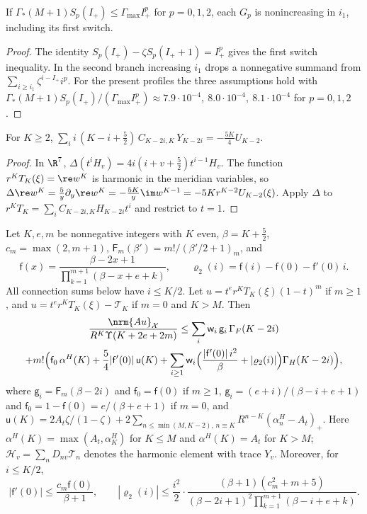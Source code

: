 \begin{lemma}\label{r7:lem-switch}
If $\Gamma_*(M+1)S_p(I_+)\leq\Gamma_{\max}I_+^p$ for $p=0,1,2$, each $G_p$ is nonincreasing in $i_1$, including its first switch.
\end{lemma}
\begin{proof}
The identity $S_p(I_+)-\zeta S_p(I_++1)=I_+^p$ gives the first switch inequality. In the second branch increasing $i_1$ drops a nonnegative summand from $\sum_{i\geq i_1}\zeta^{i-I_+}i^p$. For the present profiles the three assumptions hold with $\Gamma_*(M+1)S_p(I_+)/(\Gamma_{\max}I_+^p)\approx7.9\cdot10^{-4},\ 8.0\cdot10^{-4},\ 8.1\cdot10^{-4}$ for $p=0,1,2$.
\end{proof}
\begin{lemma}\label{r7:lem-lap}
For $K\geq2$, $\sum_ii\,(K-i+\frac52)\,C_{K-2i,K}\,Y_{K-2i}=-\frac{5K}4U_{K-2}$.
\end{lemma}

\begin{proof}
In $\R^7$, $\Delta(t^iH_v)=4i(i+v+\frac52)t^{i-1}H_v$. The function $r^KT_K(\xi)=\re w^K$ is harmonic in the meridian variables, so $\Delta\re w^K=\frac5y\partial_y\re w^K=-\frac{5K}y\im w^{K-1}=-5Kr^{K-2}U_{K-2}(\xi)$. Apply $\Delta$ to $r^KT_K=\sum_iC_{K-2i,K}H_{K-2i}t^i$ and restrict to $t=1$.
\end{proof}

\begin{lemma}\label{r7:lem-raw}
Let $K,e,m$ be nonnegative integers with $K$ even, $\beta=K+\frac52$, $c_m=\max(2,m+1)$, $\mathsf F_m(\beta')=m!/(\beta'/2+1)_m$, and
\[
\mathsf f(x)=\frac{\beta-2x+1}{\prod_{k=1}^{m+1}(\beta-x+e+k)},\qquad\varrho_2(i)=\mathsf f(i)-\mathsf f(0)-\mathsf f'(0)\,i .
\]
All connection sums below have $i\leq K/2$. Let $u=t^er^KT_K(\xi)(1-t)^m$ if $m\geq1$, and $u=t^er^KT_K(\xi)-\mathcal T_K$ if $m=0$ and $K>M$. Then
\begin{multline*}
\frac{\nrm{Au}_{\mathcal X}}{R^K\Upsilon(K+2e+2m)}\leq\sum_i\mathsf w_i\,\mathsf g_i\,\Gamma_F(K-2i)\\
+m!\Big(\mathsf f_0\,\alpha^H(K)+\frac54|\mathsf f'(0)|\,\mathsf u(K)+\sum_{i\geq1}\mathsf w_i\Big(\frac{|\mathsf f'(0)|\,i^2}\beta+|\varrho_2(i)|\Big)\Gamma_H(K-2i)\Big),
\end{multline*}
where $\mathsf g_i=\mathsf F_m(\beta-2i)$ and $\mathsf f_0=\mathsf f(0)$ if $m\geq1$, $\mathsf g_i=(e+i)/(\beta-i+e+1)$ and $\mathsf f_0=1-\mathsf f(0)=e/(\beta+e+1)$ if $m=0$, and $\mathsf u(K)=2A_t\zeta/(1-\zeta)+2\sum_{n\leq\min(M,K-2),\,n\equiv K}R^{n-K}(\alpha^H_n-A_t)_+$. Here $\alpha^H(K)=\max(A_t,\alpha^H_K)$ for $K\leq M$ and $\alpha^H(K)=A_t$ for $K>M$; $\mathcal H_v=\sum_nD_{nv}\mathcal T_n$ denotes the harmonic element with trace $Y_v$. Moreover, for $i\leq K/2$,
\[
|\mathsf f'(0)|\leq\frac{c_m\mathsf f(0)}{\beta+1},\qquad|\varrho_2(i)|\leq\frac{i^2}2\cdot\frac{(\beta+1)(c_m^2+m+5)}{(\beta-2i+1)^2\prod_{k=1}^{m+1}(\beta-i+e+k)} .
\]
\end{lemma}

